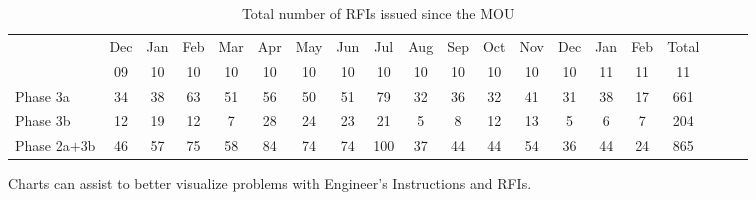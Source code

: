 \begin{fullwidth}
\begin{table}[htbp]
\vspace{1cm}
\small
\begin{tabular}{l c c c c c c c c c c c c c c c c c c c}
\toprule
~ &Dec & Jan & Feb & Mar & Apr& May & Jun & Jul & Aug & Sep &Oct & Nov  & Dec & Jan & Feb & Total\\
~ &09  & 10  & 10  & 10  & 10 & 10  & 10  & 10  & 10  & 10  &10  & 10   &10 &11 & 11& 11\\
\midrule
Phase 3a &34  & 38  & 63  & 51  & 56 & 50  & 51  & 79  & 32  & 36  &32  & 41   &31&38&17&661 \\
Phase 3b &12 &19 &12 &7 &28 &24 &23 &21 &5 &8 &12 &13 &5&6&7&204\\
\midrule
Phase 2a$+$3b &46 &57 &75 &58 &84 &74 &74 &100 &37 &44 &44 &54 &36&44&24&865\\

\bottomrule
\end{tabular}
\caption{Total number of RFIs issued since the MOU}
\label{tbl:RFI}
\end{table}
\end{fullwidth}


Charts can assist to better visualize problems with Engineer's Instructions
and RFIs.



